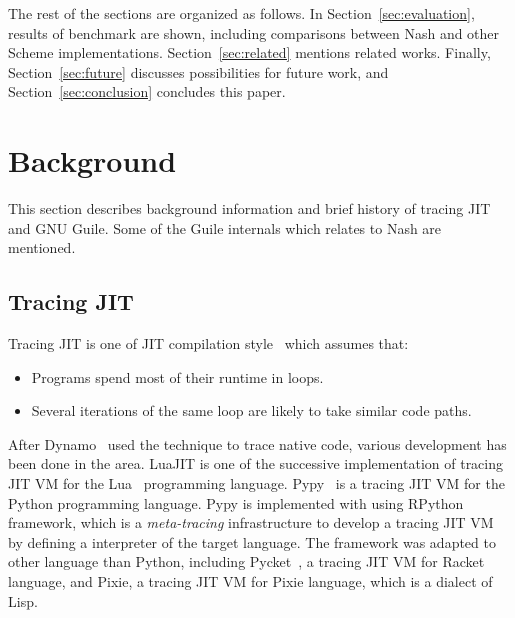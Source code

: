 \documentclass[preprint, 10pt]{sigplanconf}
\begin{document}
The rest of the sections are organized as follows. In
Section~\hyperref[sec:evaluation]{\ref{sec:evaluation}}, results of benchmark
are shown, including comparisons between Nash and other Scheme
implementations. Section~\hyperref[sec:related]{\ref{sec:related}} mentions
related works. Finally, Section~\hyperref[sec:conclusion]{\ref{sec:future}}
discusses possibilities for future work, and
Section~\hyperref[sec:conclusion]{\ref{sec:conclusion}} concludes this paper.

\section{Background}
\label{sec:background}

This section describes background information and brief history of tracing JIT
and GNU Guile. Some of the Guile internals which relates to Nash are
mentioned.

\subsection{Tracing JIT}
Tracing JIT is one of JIT compilation style~\cite{bolz2009tracing} which
assumes that:

\begin{itemize}
\item Programs spend most of their runtime in loops.
\item Several iterations of the same loop are likely to take similar code
  paths.
\end{itemize}

After Dynamo~\cite{bala2000dynamo} used the technique to trace native code,
various development has been done in the area. LuaJIT is one of the successive
implementation of tracing JIT VM for the Lua~\cite{ierusalimschy1996lua}
programming language. Pypy~\cite{bolz2009tracing} is a tracing JIT VM for the
Python programming language. Pypy is implemented with using
RPython~\cite{bolz2009tracing} framework, which is a \textit{meta-tracing}
infrastructure to develop a tracing JIT VM by defining a interpreter of the
target language. The framework was adapted to other language than Python,
including Pycket~\citep{bauman2015pycket}, a tracing JIT VM for Racket
language, and Pixie, a tracing JIT VM for Pixie language, which is a dialect
of Lisp.
\end{document}
